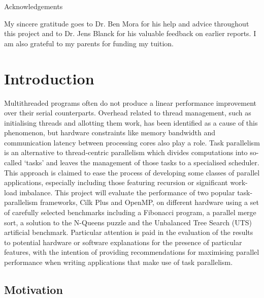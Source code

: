 \documentclass{report}
\begin{document}
\newpage
\begin{center}
{\huge Acknowledgements}
\end{center}
\hfill
\newline
\newline

\noindent
My sincere gratitude goes to Dr. Ben Mora for his help and advice throughout this project and to Dr. Jens Blanck for his valuable feedback on earlier reports. I am also grateful to my parents for funding my tuition.

\singlespacing
\newpage
\tableofcontents
\newpage
\listoffigures
\newpage
{}
\onehalfspacing

\chapter{Introduction} \label{Sec:introduction}

Multithreaded programs often do not produce a linear performance improvement over their serial counterparts. Overhead related to thread management, such as initialising threads and allotting them work, has been identified as a cause of this phenomenon, but hardware constraints like memory bandwidth and communication latency between processing cores also play a role\cite{Andrews99}. Task parallelism is an alternative to thread-centric parallelism which divides computations into so-called `tasks' and leaves the management of those tasks to a specialised scheduler\cite{Andrews99}. This approach is claimed to ease the process of developing some classes of parallel applications, especially including those featuring recursion or significant work-load imbalance\cite{Olivier09}. This project will evaluate the performance of two popular task-parallelism frameworks, Cilk Plus and OpenMP, on different hardware using a set of carefully selected benchmarks including a Fibonacci program, a parallel merge sort, a solution to the N-Queens puzzle and the Unbalanced Tree Search (UTS) artificial benchmark. Particular attention is paid in the evaluation of the results to potential hardware or software explanations for the presence of particular features, with the intention of providing recommendations for maximising parallel performance when writing applications that make use of task parallelism.

\section{Motivation} \label{Sec:motivation}
\end{document}
